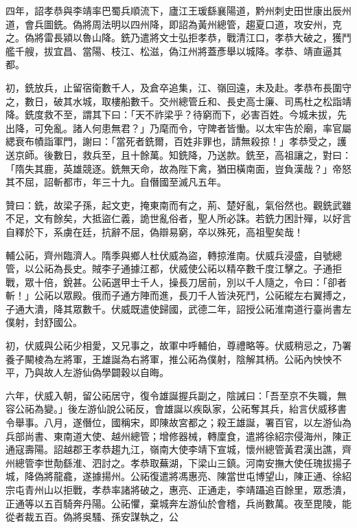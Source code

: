 \begin{pinyinscope}
 四年，詔孝恭與李靖率巴蜀兵順流下，廬江王瑗繇襄陽道，黔州刺史田世康出辰州道，會兵圖銑。偽將周法明以四州降，即詔為黃州總管，趨夏口道，攻安州，克之。偽將雷長潁以魯山降。銑乃遣將文士弘拒孝恭，戰清江口，孝恭大破之，獲鬥艦千艘，拔宜昌、當陽、枝江、松滋，偽江州將蓋彥舉以城降。孝恭、靖直逼其都。



 初，銑放兵，止留宿衛數千人，及倉卒追集，江、嶺回遠，未及赴。孝恭布長圍守之，數日，破其水城，取樓船數千。交州總管丘和、長史高士廉、司馬杜之松詣靖降。銑度救不至，謂其下曰：「天不祚梁乎？待窮而下，必害百姓。今城未拔，先出降，可免亂。諸人何患無君？」乃麾而令，守陴者皆慟。以太牢告於廟，率官屬緦衰布幘詣軍門，謝曰：「當死者銑爾，百姓非罪也，請無殺掠！」孝恭受之，護送京師。後數日，救兵至，且十餘萬。知銑降，乃送款。銑至，高祖讓之，對曰：「隋失其鹿，英雄競逐。銑無天命，故為陛下禽，猶田橫南面，豈負漢哉？」帝怒其不屈，詔斬都市，年三十九。自僭國至滅凡五年。



 贊曰：銑，故梁子孫，起文吏，掩東南而有之，荊、楚好亂，氣俗然也。觀銑武雖不足，文有餘矣，大抵盜仁義，詭世亂俗者，聖人所必誅。若銑力困計殫，以好言自釋於下，系虜在廷，抗辭不屈，偽辯易窮，卒以殊死，高祖聖矣哉！



 輔公祏，齊州臨濟人。隋季與鄉人杜伏威為盜，轉掠淮南。伏威兵浸盛，自號總管，以公祏為長史。賊李子通據江都，伏威使公祏以精卒數千度江擊之。子通拒戰，眾十倍，銳甚。公祏選甲士千人，操長刀居前，別以千人隨之，令曰：「卻者斬！」公祏以眾殿。俄而子通方陣而進，長刀千人皆決死鬥，公祏縱左右翼搏之，子通大潰，降其眾數千。伏威既遣使歸國，武德二年，詔授公祏淮南道行臺尚書左僕射，封舒國公。



 初，伏威與公祏少相愛，又兄事之，故軍中呼輔伯，尊禮略等。伏威稍忌之，乃署養子闞棱為左將軍，王雄誕為右將軍，推公祏為僕射，陰解其柄。公祏內怏怏不平，乃與故人左游仙偽學闢穀以自晦。



 六年，伏威入朝，留公祏居守，復令雄誕握兵副之，陰誡曰：「吾至京不失職，無容公祏為變。」後左游仙說公祏反，會雄誕以疾臥家，公祏奪其兵，紿言伏威移書令舉事。八月，遂僭位，國稱宋，即陳故宮都之；殺王雄誕，署百官，以左游仙為兵部尚書、東南道大使、越州總管；增修器械，轉廩食，遣將徐紹宗侵海州，陳正通寇壽陽。詔越郡王孝恭趨九江，嶺南大使李靖下宣城，懷州總管黃君漢出譙，齊州總管李世勣繇淮、泗討之。孝恭取蕪湖，下梁山三鎮。河南安撫大使任瑰拔揚子城，降偽將龍龕，遂據揚州。公祏復遣將馮惠亮、陳當世屯博望山，陳正通、徐紹宗屯青州山以拒戰，孝恭率諸將破之，惠亮、正通走，李靖躡追百餘里，眾悉潰，正通等以五百騎奔丹陽。公祏懼，棄城奔左游仙於會稽，兵尚數萬。夜至毘陵，能從者裁五百。偽將吳騷、孫安謀執之，公




\end{pinyinscope}
